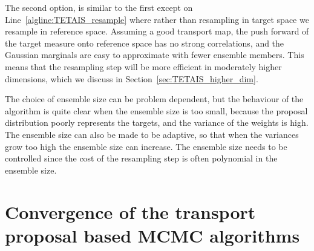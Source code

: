 \documentclass[final]{siamltex}
\newcommand{\edit}[1]{{\color{red} #1}}
\begin{document}
The second option, is similar to
the first except on Line~\ref{algline:TETAIS_resample} where rather
than resampling in target space we resample in reference
space. Assuming a good transport map, the push forward of the target
measure onto 
reference space has no strong correlations, and the
Gaussian marginals are easy to approximate with fewer ensemble
members. This means that the resampling step will be more efficient in
moderately higher dimensions, which we discuss in
Section~\ref{sec:TETAIS_higher_dim}.

\edit{The choice of ensemble size can be problem dependent, but the
  behaviour of the algorithm is quite clear when the ensemble size is
  too small, because the proposal distribution poorly represents the
  targets, and the variance of the weights is high. The ensemble size
  can also be made to be adaptive, so that when the variances grow too
high the ensemble size can increase. The ensemble size needs to be
controlled since the cost of the resampling step is often polynomial
in the ensemble size.}

\section[Convergence of transport MCMC]{Convergence of the transport proposal based MCMC algorithms}\label{sec:conv}
\end{document}
